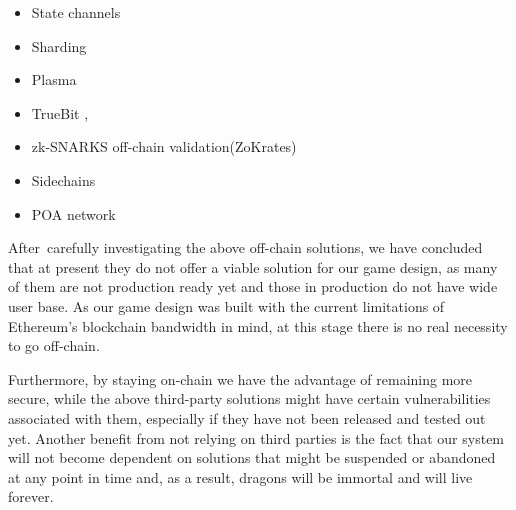 \documentclass[12pt]{article}
\begin{document}
\begin{itemize}
	\item State channels \cite{Joseph_Poon_et_al_2016}\par

	\item Sharding \cite{Vitalik_Buterin_2016}\par

	\item Plasma \cite{Josh_Stark__2018_February_12}\par

	\item TrueBit \cite{Jason_Teutsch_et_al_2017}, \cite{Julia_Koch_et_al_2018}\par

	\item zk-SNARKS off-chain validation(ZoKrates) \cite{Jacob_Eberhardt_2018}\par

	\item Sidechains \cite{Adam_Back_et_al_2014}\par
	
	\item POA network \cite{Stephen_Arsenault_2018}
\end{itemize}\par


\vspace{\baselineskip}
After\ carefully investigating the above off-chain solutions, we have concluded that at present they do not offer a viable solution for our game design, as many of them are not production ready yet and those in production do not have wide user base. As our game design was built with the current limitations of Ethereum’s blockchain bandwidth in mind, at this stage there is no real necessity to go off-chain. \par

Furthermore, by staying on-chain we have the advantage of remaining more secure, while the above third-party solutions might have certain vulnerabilities associated with them, especially if they have not been released and tested out yet. Another benefit from not relying on third parties is the fact that our system will not become dependent on solutions that might be suspended or abandoned at any point in time and, as a result, dragons will be immortal and will live forever. \par


\end{document}
